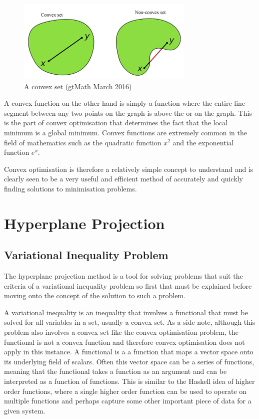 \documentclass[a4paper, notitlepage]{report}
\begin{document}
\begin{figure}[htbp]
\centering
\includegraphics[width=.9\linewidth]{./img/convex_set.png}
\caption{\label{fig:orgdbcdde9}
A convex set (gtMath March 2016) \cite{convex_set_img}}
\end{figure}

A convex function on the other hand is simply a function where the entire line
segment between any two points on the graph is above the or on the graph. This
is the part of convex optimisation that determines the fact that the local
minimum is a global minimum. Convex functions are extremely common in the field
of mathematics such as the quadratic function \(x^2\) and the exponential function
\(e^x\). 

Convex optimisation is therefore a relatively simple concept to understand and
is clearly seen to be a very useful and efficient method of accurately and
quickly finding solutions to minimisation problems.
\section{Hyperplane Projection}
\label{sec:org155c518}
\subsection{Variational Inequality Problem}
\label{sec:org2d8c1d9}
The hyperplane projection method is a tool for solving problems that suit the
criteria of a variational inequality problem so first that must be explained
before moving onto the concept of the solution to such a problem.

A variational inequality is an inequality that involves a functional that must
be solved for all variables in a set, usually a convex set. As a side note,
although this problem also involves a convex set like the convex optimisation
problem, the functional is not a convex function and therefore convex
optimisation does not apply in this instance. A functional is a a function that
maps a vector space onto its underlying field of scalars. Often this vector
space can be a series of functions, meaning that the functional takes a function
as an argument and can be interpreted as a function of functions. This is
similar to the Haskell idea of higher order functions, where a single higher
order function can be used to operate on multiple functions and perhaps capture
some other important piece of data for a given system.
\end{document}
